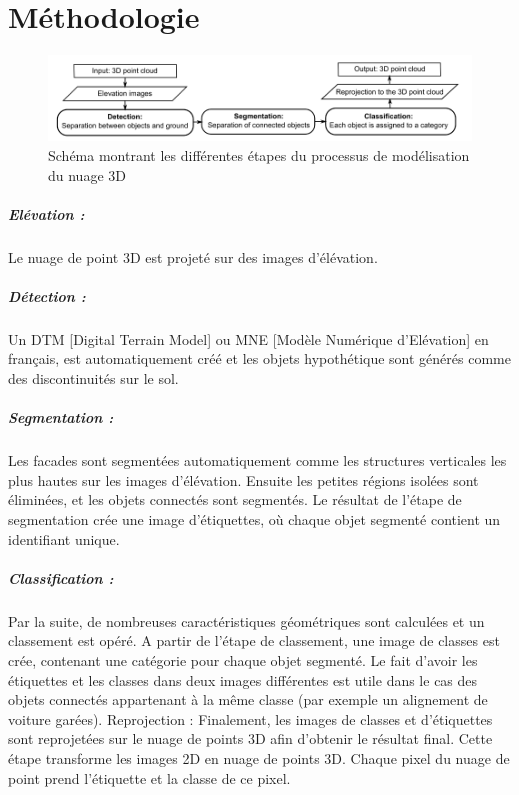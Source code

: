 \chapter{Méthodologie}

\begin{figure}[H]
\centering
\includegraphics[width=0.9\linewidth]{./images/methodo.png}
\caption{Schéma montrant les différentes étapes du processus de modélisation du nuage 3D}
\end{figure}

\paragraph{Elévation :} Le nuage de point 3D est projeté sur des images d’élévation.

\paragraph{Détection :}Un DTM [Digital Terrain Model] ou MNE [Modèle Numérique d’Elévation] en français, est automatiquement créé et les objets hypothétique sont générés comme des discontinuités sur le sol.

\paragraph{Segmentation :} Les facades sont segmentées automatiquement comme les structures verticales les plus hautes sur les images d’élévation. Ensuite les petites régions isolées sont éliminées, et les objets connectés sont segmentés. Le résultat de l’étape de segmentation crée une image d’étiquettes, où chaque objet segmenté contient un identifiant unique.

\paragraph{Classification :} Par la suite, de nombreuses caractéristiques géométriques sont calculées et un classement est opéré. A partir de l’étape de classement, une image de classes est crée, contenant une catégorie pour chaque objet segmenté. 
Le fait d’avoir les étiquettes et les classes dans deux images différentes est utile dans le cas des objets connectés appartenant à la même classe (par exemple un alignement de voiture garées). 
Reprojection : Finalement, les images de classes et d’étiquettes sont reprojetées sur le nuage de points 3D afin d’obtenir le résultat final. Cette étape transforme les images 2D en nuage de points 3D. Chaque pixel du nuage de point prend l’étiquette et la classe de ce pixel.

